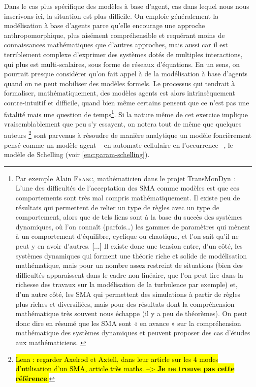 Dans le cas plus spécifique des modèles à base d'agent, cas dans lequel nous nous inscrivons ici, la situation est plus difficile.
On emploie généralement la modélisation à base d'agents parce qu'elle encourage une approche anthropomorphique, plus aisément compréhensible et requérant moins de connaissances mathématiques que d'autres approches, mais aussi car il est terriblement complexe d'exprimer des systèmes dotés de multiples interactions, qui plus est multi-scalaires, sous forme de réseaux d'équations.
En un sens, on pourrait presque considérer qu'on fait appel à de la modélisation à base d'agents quand on ne peut mobiliser des modèles formels.
Le processus qui tendrait à formaliser, mathématiquement, des modèles agents est alors intrinsèquement contre-intuitif et difficile, quand bien même certains pensent que ce n'est pas une fatalité mais une question de temps\footnote{
	Par exemple Alain \textsc{Franc}, mathématicien dans le projet TransMonDyn :
	\og L'une des difficultés de l'acceptation des SMA comme modèles est que ces comportements sont très mal compris mathématiquement.
	Il existe peu de résultats qui permettent de relier un type de règles avec un type de comportement, alors que de tels liens sont à la base du succès des systèmes dynamiques, où l'on connaît (parfois\ldots) les gammes de paramètres qui mènent à un comportement d'équilibre, cyclique ou chaotique, et l'on sait qu'il ne peut y en avoir d'autres.
	[...]
	Il existe donc une tension entre, d'un côté, les systèmes dynamiques qui forment une théorie riche et solide de modélisation mathématique, mais pour un nombre assez restreint de situations (bien des difficultés apparaissent dans le cadre non linéaire, que l'on peut lire dans la richesse des travaux sur la modélisation de la turbulence par exemple) et, d'un autre côté, les SMA qui permettent des simulations à partir de règles plus riches et diversifiées, mais pour des résultats dont la compréhension mathématique très souvent nous échappe (il y a peu de théorèmes).
	On peut donc dire en résumé que les SMA sont « en avance » sur la compréhension mathématique des systèmes dynamiques et peuvent proposer des cas d'études aux mathématiciens.\fg{}
	\autocite[Annexe 2, \og Retour sur les SMA comme outil et cadre conceptuel de modélisation.\fg{}, pp. 479-482 ]{ouriachi_lelaboration_2018}
}.
Si la nature même de cet exercice implique vraisemblablement que peu s'y essayent, on notera tout de même que quelques auteurs \autocite{zhang_tipping_2011,grauwin_dynamic_2012}\footnote{
	\hl{Lena : regarder Axelrod et Axtell, dans leur article sur les 4 modes d'utilisation d'un SMA, article très maths. --> \textbf{Je ne trouve pas cette référence}.}
} sont parvenus à résoudre de manière analytique un modèle foncièrement pensé comme un modèle agent -- en automate cellulaire en l'occurrence --, le modèle de Schelling (voir \cref{enc:param-schelling}).
